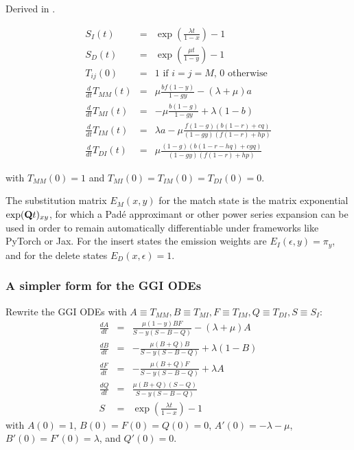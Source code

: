 \documentclass{article}
\begin{document}
Derived in \cite{Holmes2020}.

\begin{eqnarray*}
S_I(t) & = & \exp\left(\frac{\lambda t}{1-x}\right)-1 \\
S_D(t) & = & \exp\left(\frac{\mu t}{1-y}\right)-1 \\
 T_{ij}(0) & = & \mbox{1 if $i=j=M$, 0 otherwise}
\\
  \frac{d}{dt} T_{MM}(t) & = &
  \mu \frac{b f (1-y)}{1 - g y}-(\lambda +\mu )a
  \nonumber \\
  \frac{d}{dt} T_{MI}(t) & = &
  -\mu \frac{b (1-g)}{1 - g y} + \lambda (1-b)
  \nonumber \\
  \frac{d}{dt} T_{IM}(t) & = &
  \lambda a - \mu \frac{f (1-g) (b (1-r)+c q)}{(1 - g y) (f (1-r)+h p)}
  \nonumber \\
  \frac{d}{dt} T_{DI}(t) & = &
  \mu \frac{(1-g) (b (1-r-h q)+c g q)}{(1-g y) (f (1-r)+h p)}
\end{eqnarray*}

with $T_{MM}(0)=1$ and $T_{MI}(0)=T_{IM}(0)=T_{DI}(0)=0$.

The substitution matrix $E_M(x,y)$ for the match state is
the matrix exponential $\exp({\bf Q}t)_{xy}$, for which a Pad\'{e} approximant
or other power series expansion can be used in order to remain automatically differentiable under frameworks like PyTorch or Jax. %
For the insert states the emission weights are $E_I(\epsilon,y)=\pi_y$,
and for the delete states $E_D(x,\epsilon)=1$.

\subsubsection{A simpler form for the GGI ODEs}

Rewrite the GGI ODEs with $A \equiv T_{MM}, B \equiv T_{MI}, F \equiv T_{IM}, Q \equiv T_{DI}, S \equiv S_I$:
\begin{eqnarray*}
  \frac{dA}{dt} & = & \frac{\mu (1-y) B F}{S - y(S-B-Q)} - (\lambda +\mu ) A \\
  \frac{dB}{dt} & = & -\frac{\mu (B+Q) B}{S - y(S-B-Q)} + \lambda (1-B) \\
  \frac{dF}{dt} & = & -\frac{\mu (B+Q) F}{S - y(S-B-Q)} + \lambda A \\
  \frac{dQ}{dt} & = & \frac{\mu (B+Q) (S-Q)}{S - y(S-B-Q)} \\
  S & = & \exp\left(\frac{\lambda t}{1-x}\right)-1
\end{eqnarray*}
with $A(0)=1$, $B(0)=F(0)=Q(0)=0$,
$A'(0)=-\lambda-\mu$, $B'(0)=F'(0)=\lambda$, and $Q'(0)=0$.
\end{document}
